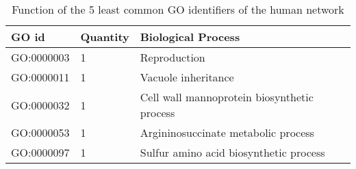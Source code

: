 \documentclass[10pt,a4paper]{article}
\begin{document}
\begin{enumerate}
	
	
	\begin{table}[H]
		\centering
		\caption{Function of the 5 least common GO identifiers of the human network}
		\label{my-label}
		\begin{tabular}{|l|l|l|}
			\hline
			\textbf{GO id} & \textbf{Quantity} & \textbf{Biological Process}                 \\ \hline
			GO:0000003     & 1                 & Reproduction                                \\ \hline
			GO:0000011     & 1                 & Vacuole inheritance                         \\ \hline
			GO:0000032     & 1                 & Cell wall mannoprotein biosynthetic process \\ \hline
			GO:0000053     & 1                 & Argininosuccinate metabolic process         \\ \hline
			GO:0000097     & 1                 & Sulfur amino acid biosynthetic process      \\ \hline
		\end{tabular}
	\end{table}




\end{enumerate}
\end{document}
